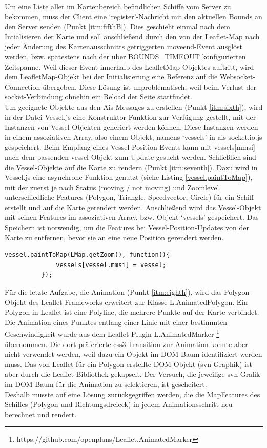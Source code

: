 Um eine Liste aller im Kartenbereich befindlichen Schiffe vom Server zu bekommen, muss der Client eine ‘register’-Nachricht mit den aktuellen Bounds an den Server senden (Punkt \ref{itm:fifthB}).
Dies geschieht einmal nach dem Intialisieren der Karte und soll anschließend durch den von der Leaflet-Map nach jeder Änderung des Kartenausschnitts getriggerten moveend-Event ausglöst werden, bzw. spätestens nach der über BOUNDS\_TIMEOUT konfigurierten Zeitspanne. Weil dieser Event innerhalb des LeafletMap-Objektes auftritt, wird dem LeafletMap-Objekt bei der Initialisierung eine Referenz auf die Websocket-Connection übergeben. Diese Lösung ist unproblematisch, weil beim Verlust der socket-Verbindung ohnehin ein Reload der Seite stattfindet.\\
Um geeignete Objekte aus den Ais-Messages zu erstellen (Punkt \ref{itm:sixth}), wird in der Datei Vessel.js eine Konstruktor-Funktion zur Verfügung gestellt, mit der Instanzen von Vessel-Objekten generiert werden können. Diese Instanzen werden in einem assoziativen Array, also einem Objekt, namens ‘vessels’ in ais-socket.io.js gespeichert. Beim Empfang eines Vessel-Position-Events kann mit vessels[mmsi] nach dem passenden vessel-Objekt zum Update gesucht werden.
Schließlich sind die Vessel-Objekte auf die Karte zu rendern (Punkt \ref{itm:seventh}). Dazu wird in Vessel.js eine asynchrone Funktion genutzt (siehe Listing \ref{vessel.paintToMap}), mit der zuerst je nach Status (moving / not moving) und Zoomlevel unterschiedliche Features (Polygon, Triangle, Speedvector, Circle) für ein Schiff erstellt und auf die Karte gerendert werden. Anschließend wird das Vessel-Objekt mit seinen Features im assoziativen Array, bzw. Objekt ‘vessels’ gespeichert. Das Speichern ist notwendig, um die Features bei Vessel-Position-Updates von der Karte zu entfernen, bevor sie an eine neue Position gerendert werden.
\begin{lstlisting}[caption=Aufruf der public function paintToMap des Vessel-Objekts in ais-socket.io.js, label=vessel.paintToMap]
          vessel.paintToMap(LMap.getZoom(), function(){
              vessels[vessel.mmsi] = vessel;
          });
\end{lstlisting}

Für díe letzte Aufgabe, die Animation (Punkt \ref{itm:eighth}), wird das Polygon-Objekt des Leaflet-Frameworks erweitert zur Klasse L.AnimatedPolygon. Ein Polygon in Leaflet ist eine Polyline, die mehrere Punkte auf der Karte verbindet. Die Animation eines Punktes entlang einer Linie mit einer bestimmten Geschwindigkeit wurde aus dem Leaflet-Plugin L.AnimatedMarker \footnote{https://github.com/openplans/Leaflet.AnimatedMarker} übernommen. Die dort präferierte css3-Transition zur Animation konnte aber nicht verwendet werden, weil dazu ein Objekt im DOM-Baum identifiziert werden muss. Das von Leaflet für ein Polygon erstellte DOM-Objekt (svn-Graphik) ist aber durch die Leaflet-Bibliothek gekapselt. Der Versuch, die jeweilige svn-Grafik im DOM-Baum für die Animation zu selektieren, ist gescheitert. \\
Deshalb musste auf eine Lösung zurückgegriffen werden, die die MapFeatures des Schiffes (Polygon und Richtungsdreieck) in jedem Animationsschritt neu berechnet und rendert.

